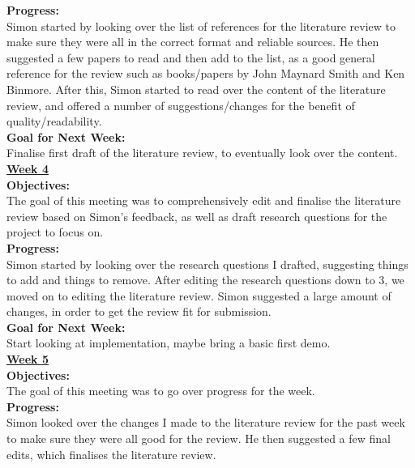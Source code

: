 \documentclass[12pt,a4paper]{article}
\begin{document}
\begin{appendices}
\textbf{Progress:} \\
Simon started by looking over the list of references for the literature review to make sure they were all in the correct format and reliable sources. He then suggested a few papers to read and then add to the list, as a good general reference for the review such as books/papers by John Maynard Smith and Ken Binmore. After this, Simon started to read over the content of the literature review, and offered a number of suggestions/changes for the benefit of quality/readability. \\

\textbf{Goal for Next Week:} \\
Finalise first draft of the literature review, to eventually look over the content. \\

\textbf{\underline{Week 4}} \\
\newline
\textbf{Objectives:} \\
The goal of this meeting was to comprehensively edit and finalise the literature review based on Simon’s feedback, as well as draft research questions for the project to focus on. \\

\textbf{Progress:} \\
Simon started by looking over the research questions I drafted, suggesting things to add and things to remove. After editing the research questions down to 3, we moved on to editing the literature review. Simon suggested a large amount of changes, in order to get the review fit for submission. \\

\textbf{Goal for Next Week:} \\
Start looking at implementation, maybe bring a basic first demo. \\

\textbf{\underline{Week 5}} \\
\newline
\textbf{Objectives:} \\
The goal of this meeting was to go over progress for the week. \\

\textbf{Progress:} \\
Simon looked over the changes I made to the literature review for the past week to make sure they were all good for the review. He then suggested a few final edits, which finalises the literature review. \\


\end{appendices}
\end{document}
